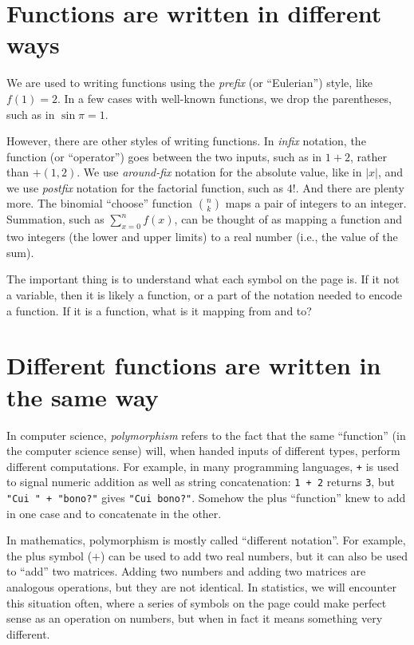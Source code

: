 \section{Functions are written in different ways}

We are used to writing functions using the \emph{prefix} (or ``Eulerian'') style,
like $f(1) = 2$. In a few cases with well-known functions, we drop the parentheses,
such as in $\sin \pi = 1$.

However, there are other styles of writing functions. In \emph{infix} notation, the
function (or ``operator'') goes between the two inputs, such as in $1 + 2$, rather
than $+(1, 2)$. We use \emph{around-fix} notation for the absolute value, like in $|x|$,
and we use \emph{postfix} notation for the factorial function, such as $4!$. And
there are plenty more. The binomial ``choose'' function $\binom{n}{k}$ maps a pair of
integers to an integer. Summation, such as $\sum_{x=0}^n f(x)$, can be thought of as
mapping a function and two integers (the lower and upper limits) to a real number (i.e.,
the value of the sum).

The important thing is to understand what each symbol on the page is. If it not a
variable, then it is likely a function, or a part of the notation needed to encode
a function. If it is a function, what is it mapping from and to?


\section{Different functions are written in the same way}

In computer science, \emph{polymorphism} refers to the fact that the same ``function''
(in the computer science sense) will, when handed inputs of different types, perform
different computations. For example, in many programming languages, \texttt{+} is used
to signal numeric addition as well as string concatenation: \texttt{1 + 2} returns \texttt{3},
but \texttt{"Cui " + "bono?"} gives \texttt{"Cui bono?"}. Somehow the plus
``function'' knew to add in one case and to concatenate in the
other.

In mathematics, polymorphism is mostly called ``different notation''. For example,
the plus symbol ($+$) can be used to add two real numbers, but it can also be used
to ``add'' two matrices. Adding two numbers and adding two matrices are analogous
operations, but they are not identical. In statistics, we will encounter this situation
often, where a series of symbols on the page could make perfect sense as an operation
on numbers, but when in fact it means something very different.


